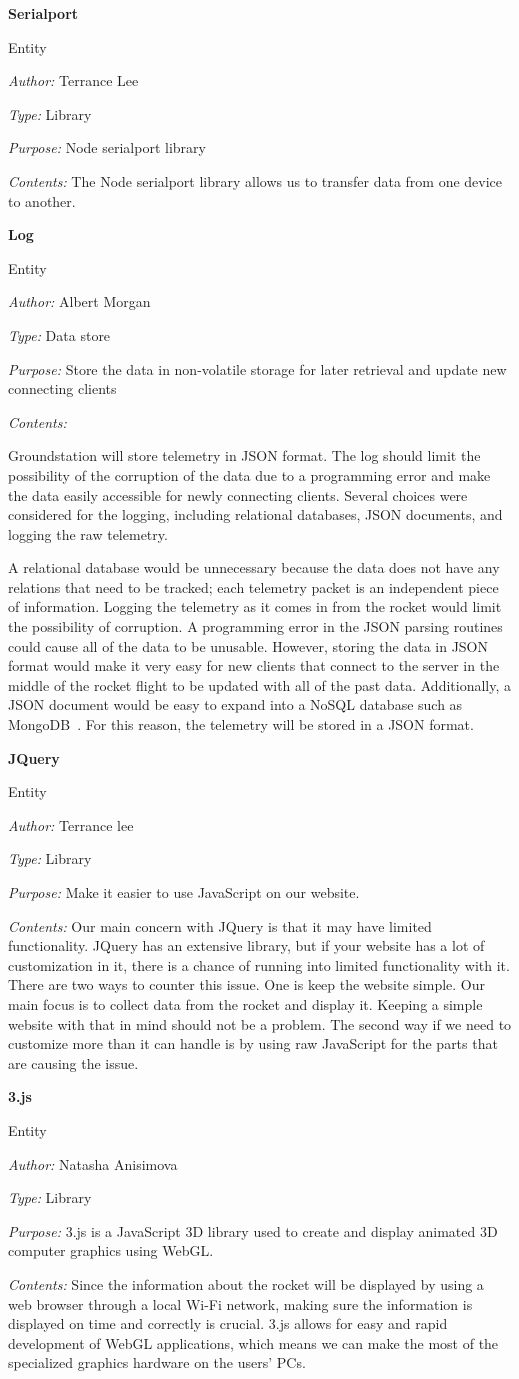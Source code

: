 \documentclass[10pt,draftclsnofoot,onecolumn]{IEEEtran}
\newcommand{\newentity}[5]{

	\noindent\textbf{#2}
	
	\noindent Entity
	
	\noindent\textit{Author:} {#1}
		
	\noindent\textit{Type:} {#3}
	
	\noindent\textit{Purpose:} {#4}

	\noindent\textit{Contents:} {#5}
	\vspace{.5cm}

}
\begin{document}
	\newentity
	{Terrance Lee}
	{Serialport}
	{Library}
	{Node serialport library}
	{The Node serialport library allows us to transfer data from one device to another. }

	\newentity
	{Albert Morgan}
	{Log}
	{Data store}
	{Store the data in non-volatile storage for later retrieval and update new connecting clients}
	{
		Groundstation will store telemetry in JSON format.
		The log should limit the possibility of the corruption of the data due to a programming error
		and make the data easily accessible for newly connecting clients.
		Several choices were considered for the logging, including relational databases, JSON documents, and logging the raw telemetry.
		
		A relational database would be unnecessary because the data does not have any relations that need to be tracked;
		each telemetry packet is an independent piece of information.
		Logging the telemetry as it comes in from the rocket would limit the possibility of corruption.
		A programming error in the JSON parsing routines could cause all of the data to be unusable.
		However, storing the data in JSON format would make it very easy for new clients that connect to the server in the middle of the rocket flight to be updated with all of the past data.
		Additionally, a JSON document would be easy to expand into a NoSQL database such as MongoDB~\cite{mongodb}.
		For this reason, the telemetry will be stored in a JSON format.
	}
	
	
	\newentity
	{Terrance lee}
	{JQuery}
	{Library}
	{Make it easier to use JavaScript on our website. }
	{Our main concern with JQuery is that it may have limited functionality.  JQuery has an extensive library, but if your website has a lot of customization in it, there is a chance of running into limited functionality with it.  There are two ways to counter this issue.  One is keep the website simple.  Our main focus is to collect data from the rocket and display it.  Keeping a simple website with that in mind should not be a problem.  The second way if we need to customize more than it can handle is by using raw JavaScript for the parts that are causing the issue.}
	
	\newentity
	{Natasha Anisimova}
	{3.js}
	{Library}
	{3.js is a JavaScript 3D library used to create and display animated 3D computer graphics using WebGL.}
	{	Since the information about the rocket will be displayed by using a web browser through a local Wi-Fi network, 
		making sure the information is displayed on time and correctly is crucial. 3.js allows for easy and rapid development
		of WebGL applications, which means we can make the most of the specialized graphics hardware on the users'
		PCs.
	}
\end{document}

